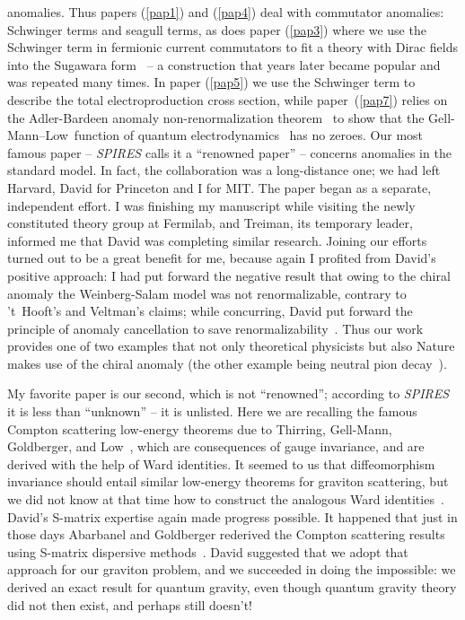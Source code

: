 \documentclass[a4paper,12pt,twoside]{article}
\providecommand{\refpap}[1]{(\ref{pap#1})}
\begin{document}
anomalies.  Thus papers \refpap1 and \refpap4 deal with commutator anomalies: 
Schwinger terms and seagull terms,  as does paper \refpap3 where we use the
Schwinger term in fermionic current commutators to fit a theory with Dirac fields into
the Sugawara form~\cite{ref1A} -- a construction that years later became popular and
was repeated many times. In paper
\refpap5 we use the Schwinger term to describe the total electroproduction cross
section, while paper~\refpap7 relies on the Adler-Bardeen anomaly
non-renormalization theorem~\cite{ref2A} to show that the Gell-Mann--Low~function
of quantum electrodynamics~\cite{ref3A} has no zeroes.  Our most famous paper --
{\sl\uppercase{Spires}} calls it a ``renowned paper'' --  concerns anomalies in the
standard model.  In fact, the collaboration was a long-distance one;  we had left
Harvard, David for Princeton and I for MIT.  The paper began as a separate,
independent effort.  I was finishing my manuscript while visiting the newly
constituted theory group at Fermilab, and Treiman, its temporary leader, informed
me that David was completing similar research.  Joining our efforts turned out to be a
great benefit for me, because  again I profited from David's positive approach:  I had
put forward the negative result that owing to the chiral anomaly the
Weinberg-Salam model was not renormalizable, contrary to 't~Hooft's and Veltman's
claims; while concurring, David put forward the principle of anomaly cancellation to
save renormalizability~\cite{ref4A}.  Thus our work provides one of two examples
that not only theoretical physicists  but also Nature makes use of the chiral anomaly
(the other example being neutral pion decay~\cite{ref5A}).

My favorite paper is our second, which is not ``renowned''; according to
{\sl\uppercase{Spires}} it is less than ``unknown'' -- it is unlisted. Here we are
recalling the famous Compton scattering low-energy theorems due to Thirring,
Gell-Mann, Goldberger, and Low~\cite{ref6A}, which are consequences of gauge
invariance, and are derived with the help of Ward identities. It seemed to us that
diffeomorphism invariance should entail similar low-energy theorems for graviton
scattering, but we did not know at that time how to construct the analogous Ward
identities~\cite{ref7A}.   David's S-matrix expertise again made progress possible.
It happened that just in those days Abarbanel and Goldberger rederived the
Compton scattering results using S-matrix dispersive methods~\cite{ref8A}. David
suggested that we adopt that approach for our graviton problem, and we succeeded
in doing the impossible: we derived an exact result for quantum gravity, even though
quantum gravity theory did not then exist, and perhaps still doesn't!
\end{document}
